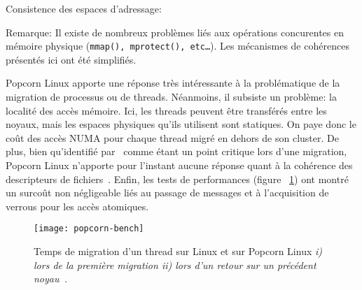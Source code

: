 \begin{paragraph}{Consistence des espaces d'adressage:}
        \begin{paragraph}{Remarque:}
          Il existe de nombreux problèmes liés aux opérations concurentes en
          mémoire physique (\texttt{mmap(), mprotect(), etc\ldots}). Les
          mécanismes de cohérences présentés ici ont été simplifiés.\\
        \end{paragraph}

      \end{paragraph}

      Popcorn Linux apporte une réponse très intéressante à la problématique de
      la migration de processus ou de threads. Néanmoins, il subsiste un
      problème: la localité des accès mémoire. Ici, les threads peuvent être
      transférés entre les noyaux, mais les espaces physiques qu'ils utilisent
      sont statiques. On paye donc le coût des accès NUMA pour chaque thread
      migré en dehors de son cluster. De plus, bien qu'identifié
      par~\citeauthor{katz2013popcorn} comme étant un point critique lors d'une
      migration, Popcorn Linux n'apporte pour l'instant aucune réponse quant à
      la cohérence des descripteurs de fichiers~\citep[pageo
        4]{katz2013popcorn}. Enfin, les tests de performances (figure
      ~\ref{fig:popcorn-bench}) ont montré un surcoût non négligeable liés au
      passage de messages et à l'acquisition de verrous pour les accès
      atomiques.

      \begin{figure}[ht]
        \centering \texttt{[image: popcorn-bench]}
        \caption{Temps de migration d'un thread sur Linux et sur Popcorn Linux
          \itshape i) \upshape lors de la première migration \itshape ii)
          \upshape lors d'un retour sur un précédent
          noyau~\citep{katz2013popcorn}.}
        \label{fig:popcorn-bench}
      \end{figure}


